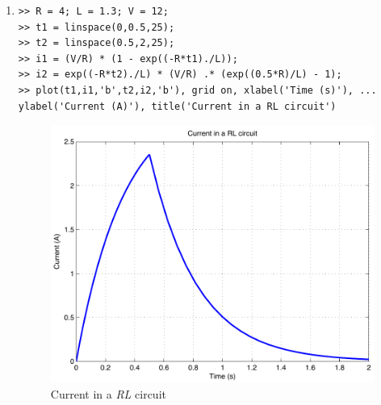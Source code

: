 \begin{enumerate}
\clearpage
\item
\begin{lstlisting}
>> R = 4; L = 1.3; V = 12;
>> t1 = linspace(0,0.5,25);
>> t2 = linspace(0.5,2,25);
>> i1 = (V/R) * (1 - exp((-R*t1)./L));
>> i2 = exp((-R*t2)./L) * (V/R) .* (exp((0.5*R)/L) - 1);
>> plot(t1,i1,'b',t2,i2,'b'), grid on, xlabel('Time (s)'), ...
ylabel('Current (A)'), title('Current in a RL circuit')
\end{lstlisting}
\begin{figure}[h]
	\myfloatalign
	\includegraphics[width=\linewidth]{Graphics/Additional-Ex/RL-circuit-plot}
	\caption{Current in a \textit{RL} circuit}
	\label{fig:RL-circuit-plot}
\end{figure}


\end{enumerate}

